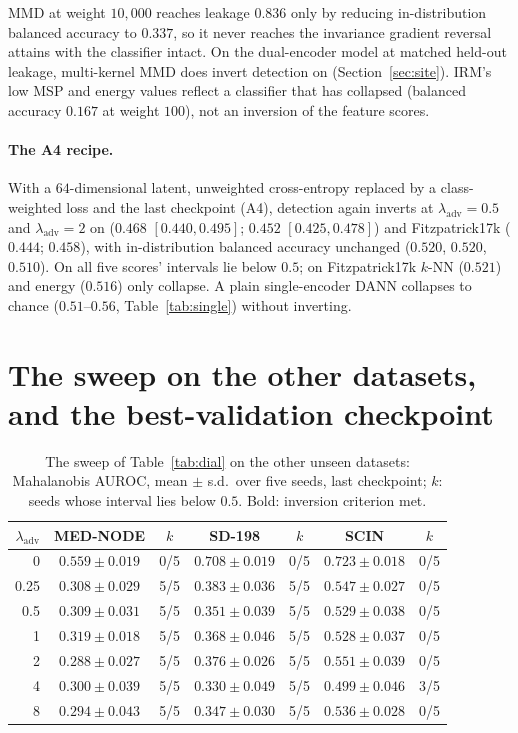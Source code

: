 \documentclass{midl}
\newcommand{\lam}{\lambda_{\mathrm{adv}}}
\begin{document}
MMD at weight $10{,}000$ reaches leakage $0.836$ only by reducing in-distribution balanced
accuracy to $0.337$, so it never reaches the invariance gradient reversal attains with the
classifier intact. On the dual-encoder model at matched held-out leakage, multi-kernel MMD
does invert detection on \texttt{} (Section~\ref{sec:site}). IRM's low MSP and energy
values reflect a classifier that has collapsed (balanced accuracy $0.167$ at weight $100$),
not an inversion of the feature scores.

\paragraph{The A4 recipe.} With a $64$-dimensional latent, unweighted cross-entropy replaced
by a class-weighted loss and the last checkpoint (A4), detection again inverts at
$\lam=0.5$ and $\lam=2$ on \texttt{} ($0.468$ $[0.440, 0.495]$; $0.452$
$[0.425, 0.478]$) and Fitzpatrick17k ($0.444$; $0.458$), with in-distribution balanced
accuracy unchanged ($0.520$, $0.520$, $0.510$). On \texttt{} all five scores'
intervals lie below $0.5$; on Fitzpatrick17k $k$-NN ($0.521$) and energy ($0.516$) only
collapse. A plain single-encoder DANN collapses to chance ($0.51$--$0.56$, Table~\ref{tab:single}) without inverting.

\FloatBarrier
\section{The sweep on the other datasets, and the best-validation checkpoint}
\label{app:bestval}

\begin{table}[h]
\centering
\caption{The sweep of Table~\ref{tab:dial} on the other unseen datasets: Mahalanobis AUROC, mean $\pm$ s.d.\ over
five seeds, last checkpoint; $k$: seeds whose interval lies below $0.5$. Bold: inversion criterion met.}
\label{tab:dialrest}
\begin{tabular}{rcccccc}
\toprule
$\lam$ & MED-NODE & $k$ & SD-198 & $k$ & SCIN & $k$ \\
\midrule
0 & $0.559\pm0.019$ & 0/5 & $0.708\pm0.019$ & 0/5 & $0.723\pm0.018$ & 0/5 \\
0.25 & $\mathbf{0.308\pm0.029}$ & 5/5 & $\mathbf{0.383\pm0.036}$ & 5/5 & $0.547\pm0.027$ & 0/5 \\
0.5 & $\mathbf{0.309\pm0.031}$ & 5/5 & $\mathbf{0.351\pm0.039}$ & 5/5 & $0.529\pm0.038$ & 0/5 \\
1 & $\mathbf{0.319\pm0.018}$ & 5/5 & $\mathbf{0.368\pm0.046}$ & 5/5 & $0.528\pm0.037$ & 0/5 \\
2 & $\mathbf{0.288\pm0.027}$ & 5/5 & $\mathbf{0.376\pm0.026}$ & 5/5 & $0.551\pm0.039$ & 0/5 \\
4 & $\mathbf{0.300\pm0.039}$ & 5/5 & $\mathbf{0.330\pm0.049}$ & 5/5 & $0.499\pm0.046$ & 3/5 \\
8 & $\mathbf{0.294\pm0.043}$ & 5/5 & $\mathbf{0.347\pm0.030}$ & 5/5 & $0.536\pm0.028$ & 0/5 \\
\bottomrule
\end{tabular}
\end{table}
\end{document}
